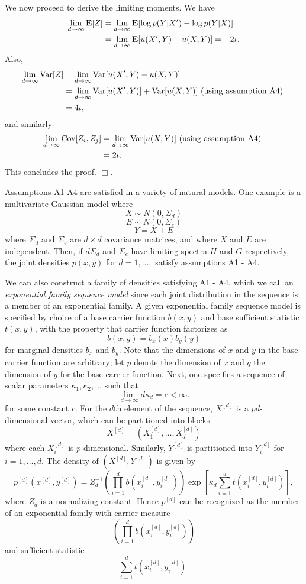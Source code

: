 \documentclass[12pt]{article}
\begin{document}
We now proceed to derive the limiting moments.
We have
\begin{align*}
\lim_{d \to \infty} \textbf{E}[Z] 
&= \lim_{d \to \infty} \textbf{E}[ \log p(Y|X') - \log p(Y|X)]
\\&= \lim_{d \to \infty} \textbf{E}[ u(X', Y) - u(X, Y) ] = -2\iota.
\end{align*}
Also,
\begin{align*}
\lim_{d \to \infty} \text{Var}[Z]
 &= \lim_{d \to \infty} \text{Var}[ u(X', Y) - u(X, Y) ]
\\&= \lim_{d \to \infty} \text{Var}[ u(X', Y)] +\text{Var}[ u(X, Y) ]\text{ (using assumption A4) }
\\&= 4\iota,
\end{align*}
and similarly
\begin{align*}
\lim_{d \to \infty} \text{Cov}[Z_i, Z_j]
&= \lim_{d \to \infty} \text{Var}[ u(X, Y)]\text{ (using assumption A4) }
\\&= 2\iota.
\end{align*}
This concludes the proof. $\Box$.

Assumptions A1-A4 are satisfied in a variety of natural models.
One example is a multivariate Gaussian model where
\[
X \sim N(0, \Sigma_d)
\]
\[
E \sim N(0, \Sigma_e)
\]
\[
Y = X + E
\]
where $\Sigma_d$ and $\Sigma_e$ are $d \times d$ covariance matrices, and where $X$ and $E$ are independent.  Then, if $d \Sigma_d$ and $\Sigma_e$ have limiting spectra $H$ and $G$ respectively,
the joint densities $p(x, y)$ for $d = 1,\hdots, $ satisfy assumptions A1 - A4.

We can also construct a family of densities satisfying A1 - A4,
which we call an \emph{exponential family sequence model} since each joint distribution in the sequence
is a member of an exponential family.
A given exponential family sequence model is specified by choice of a base carrier function $b(x, y)$ and base sufficient statistic $t(x, y)$, with the property that carrier function factorizes as
\[
b(x, y) = b_x(x) b_y(y)
\]
for marginal densities $b_x$ and $b_y$.
Note that the dimensions of $x$ and $y$ in the base carrier function are arbitrary;
let $p$ denote the dimension of $x$ and $q$ the dimension of $y$ for the base carrier function.
Next, one specifies a sequence of scalar parameters $\kappa_1, \kappa_2,\hdots$ such that
\[
\lim_{d \to \infty} d \kappa_d = c < \infty.
\]
for some constant $c$.
For the $d$th element of the sequence, $X^{[d]}$ is a $pd$-dimensional vector,
which can be partitioned into blocks
\[
X^{[d]} = (X_1^{[d]},\hdots, X_d^{[d]})
\]
where each $X_i^{[d]}$ is $p$-dimensional.  Similarly, $Y^{[d]}$ is partitioned into $Y_i^{[d]}$ for $i = 1,\hdots, d$.
The density of $(X^{[d]}, Y^{[d]})$ is given by
\[
p^{[d]}(x^{[d]}, y^{[d]}) = Z_d^{-1} \left(\prod_{i=1}^d b(x_i^{[d]}, y_i^{[d]}) \right) 
\exp\left[\kappa_d \sum_{i=1}^d t(x_i^{[d]}, y_i^{[d]}) \right],
\]
where $Z_d$ is a normalizing constant.
Hence $p^{[d]}$ can be recognized as the member of an exponential family with carrier measure
\[
\left(\prod_{i=1}^d b(x_i^{[d]}, y_i^{[d]}) \right)
\]
and sufficient statistic
\[
\sum_{i=1}^d t(x_i^{[d]}, y_i^{[d]}).
\]
\end{document}
